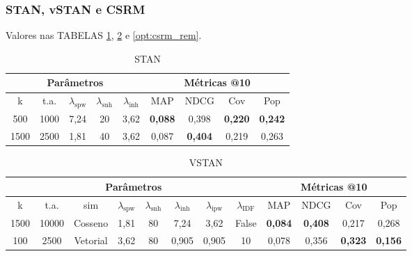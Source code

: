 \subsubsection{STAN, vSTAN e CSRM}
Valores nas TABELAS \ref{opt:stan_rem}, \ref{opt:vstan_rem} e \ref{opt:csrm_rem}.

\begin{table}[htbp]
  \centering
  \begin{tabular}{|c|c|c|c|c|c|c|c|c|}
    \hline
      \multicolumn{5}{|c|}{Parâmetros} & \multicolumn{4}{c|}{Métricas @10} \\
      \hline
      k & t.a. & $\lambda_{\text{spw}}$ & $\lambda_{\text{snh}}$ & $\lambda_{\text{inh}}$ & MAP & NDCG & Cov & Pop \\
      \hline
      500 & 1000 & 7,24 & 20 & 3,62 & \textbf{0,088} & 0,398 & \textbf{0,220} & \textbf{0,242} \\
      \hline
      1500 & 2500 & 1,81 & 40 & 3,62 & 0,087 & \textbf{0,404} & 0,219 & 0,263 \\
      \hline 
\end{tabular}
      \caption{STAN}
      \label{opt:stan_rem}
\end{table}

\begin{table}[htbp]
  \centering
  \begin{tabular}{|c|c|c|c|c|c|c|c|c|c|c|c|}
    \hline
      \multicolumn{8}{|c|}{Parâmetros} & \multicolumn{4}{c|}{Métricas @10} \\
      \hline
      k & t.a. & sim & $\lambda_{\text{spw}}$ & $\lambda_{\text{snh}}$ & $\lambda_{\text{inh}}$ & $\lambda_{\text{ipw}}$ & $\lambda_{\text{IDF}}$ & MAP & NDCG & Cov & Pop \\
      \hline
      1500 & 10000 & Cosseno & 1,81 & 80 & 7,24 & 3,62 & False & \textbf{0,084} & \textbf{0,408} & 0,217 & 0,268 \\
      \hline
      100 & 2500 & Vetorial & 3,62 & 80 & 0,905 & 0,905 & 10 & 0,078 & 0,356 & \textbf{0,323} & \textbf{0,156} \\
      \hline
\end{tabular}
      \caption{VSTAN}
      \label{opt:vstan_rem}
\end{table}

